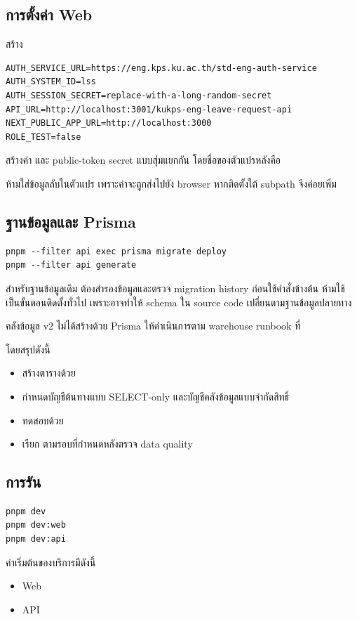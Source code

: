 \newpage

\subsection{การตั้งค่า Web}
สร้าง 
\begin{lstlisting}
AUTH_SERVICE_URL=https://eng.kps.ku.ac.th/std-eng-auth-service
AUTH_SYSTEM_ID=lss
AUTH_SESSION_SECRET=replace-with-a-long-random-secret
API_URL=http://localhost:3001/kukps-eng-leave-request-api
NEXT_PUBLIC_APP_URL=http://localhost:3000
ROLE_TEST=false
\end{lstlisting}
สร้างค่า  และ public-token secret แบบสุ่มแยกกัน โดยชื่อของตัวแปรหลังคือ
\begin{center}
\end{center}
ห้ามใส่ข้อมูลลับในตัวแปร  เพราะค่าจะถูกส่งไปยัง browser หากติดตั้งใต้ subpath จึงค่อยเพิ่ม 

\subsection{ฐานข้อมูลและ Prisma}
\begin{lstlisting}
pnpm --filter api exec prisma migrate deploy
pnpm --filter api generate
\end{lstlisting}
สำหรับฐานข้อมูลเดิม ต้องสำรองข้อมูลและตรวจ migration history ก่อนใช้คำสั่งข้างต้น ห้ามใช้  เป็นขั้นตอนติดตั้งทั่วไป เพราะอาจทำให้ schema ใน source code เปลี่ยนตามฐานข้อมูลปลายทาง

คลังข้อมูล v2 ไม่ได้สร้างด้วย Prisma ให้ดำเนินการตาม warehouse runbook ที่
\begin{center}
\end{center}
โดยสรุปดังนี้
\begin{itemize}
  \item สร้างตารางด้วย 
  \item กำหนดบัญชีต้นทางแบบ SELECT-only และบัญชีคลังข้อมูลแบบจำกัดสิทธิ์
  \item ทดสอบด้วย 
  \item เรียก  ตามรอบที่กำหนดหลังตรวจ data quality
\end{itemize}

\subsection{การรัน}
\begin{lstlisting}
pnpm dev
pnpm dev:web
pnpm dev:api
\end{lstlisting}
ค่าเริ่มต้นของบริการมีดังนี้
\begin{itemize}
  \item Web

  \item API

\end{itemize}
